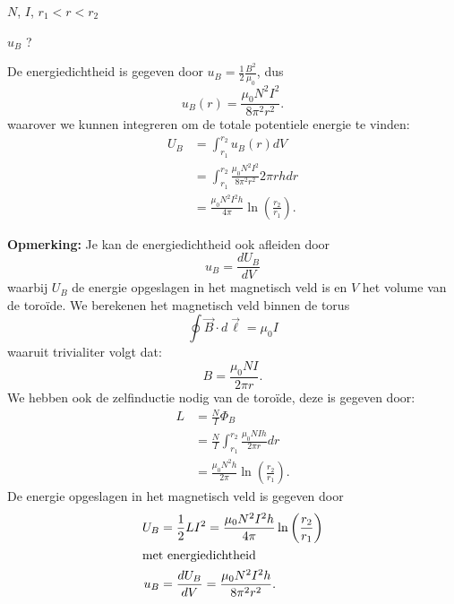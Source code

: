 \begin{description}[labelwidth=1.5cm, leftmargin=!]
    \item[Geg. :] $N$, $I$, $r_1 < r < r_2$
    \item[Gevr. :] $u_B$ ? 
    \item[Opl. :]
    De energiedichtheid is gegeven door $u_B = \frac{1}{2} \frac{B^2}{\mu_0}$, dus
    \begin{equation*}
        u_B(r) = \frac{\mu_0 N^2 I^2}{8\pi^2 r^2}.
    \end{equation*}
    waarover we kunnen integreren om de totale potentiele energie te vinden:
    \begin{align*}
        U_B 
            &= \int_{r_1}^{r_2} u_B(r) dV \\
            &= \int_{r_1}^{r_2} \frac{\mu_0 N^2 I^2}{8\pi^2 r^2} 2\pi r h dr \\
            &= \frac{\mu_0 N^2 I^2 h}{4\pi} \ln \left(\frac{r_2}{r_1}\right).
    \end{align*}

    \vspace{0.3cm}
    \textbf{Opmerking:} 
        Je kan de energiedichtheid ook afleiden door 
        \begin{equation*}
            u_B = \frac{dU_B}{dV}
        \end{equation*} 
        waarbij $U_B$ de energie opgeslagen in het magnetisch veld is en $V$ het volume van de toroïde. We berekenen het magnetisch veld binnen de torus
        \begin{equation*}
            \oint \vec{B} \cdot d\vec{\ell} = \mu_0 I
        \end{equation*}
        waaruit trivialiter volgt dat:
        \begin{equation*}
            B = \frac{\mu_0 N I}{2\pi r}.
        \end{equation*}  
        We hebben ook de zelfinductie nodig van de toroïde, deze is gegeven door:
        \begin{align*}
            L 
                &= \frac{N}{I} \Phi_B \\
                &= \frac{N}{I} \int_{r_1}^{r_2} \frac{\mu_0 N I h }{2\pi r} dr \\
                &= \frac{\mu_0 N^2 h}{2\pi} \ln \left(\frac{r_2}{r_1}\right).
        \end{align*}
        De energie opgeslagen in het magnetisch veld is gegeven door
        \begin{align*}
            U_B &= \frac{1}{2}LI^2 = \frac{\mu_0 N^2  I^2 h}{4\pi} \ln \left(\frac{r_2}{r_1}\right) \\
        \intertext{met energiedichtheid}
            u_B &= \frac{dU_B}{dV} = \frac{\mu_0 N^2  I^2 h}{8\pi^2r^2}.
        \end{align*}

\end{description}

\vspace{1cm}